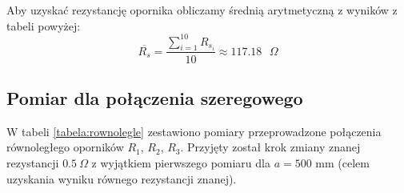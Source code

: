 \documentclass[a4paper,12pts]{article}
\begin{document}
	\begin{table}[!h]
		\centering
		\caption{Wyniki pomiarów dla połączenia szeregowego}
		\label{tabela:szeregowe}
	\end{table}
	
	Aby uzyskać rezystancję opornika obliczamy średnią arytmetyczną z wyników z tabeli powyżej:
	\begin{equation}
	\overline{R_{s}} = \frac{\sum_{i = 1}^{10} R_{{s}_i}}{10} \approx 117.18 \textrm{ $\Omega$}
	\end{equation}
	
	
	\subsection{Pomiar dla połączenia szeregowego}
	W tabeli \ref{tabela:rownolegle} zestawiono pomiary przeprowadzone połączenia równoległego oporników $R_1$, $R_2$, $R_3$. Przyjęty został krok zmiany znanej rezystancji $0.5 ~\Omega$ z wyjątkiem pierwszego pomiaru dla $a = 500$ mm (celem uzyskania wyniku równego rezystancji znanej).
	
	\begin{table}[!h]
		\centering
		\caption{Wyniki pomiarów dla połączenia szeregowego}
		\label{tabela:rownolegle}
	\end{table}
	
\end{document}
